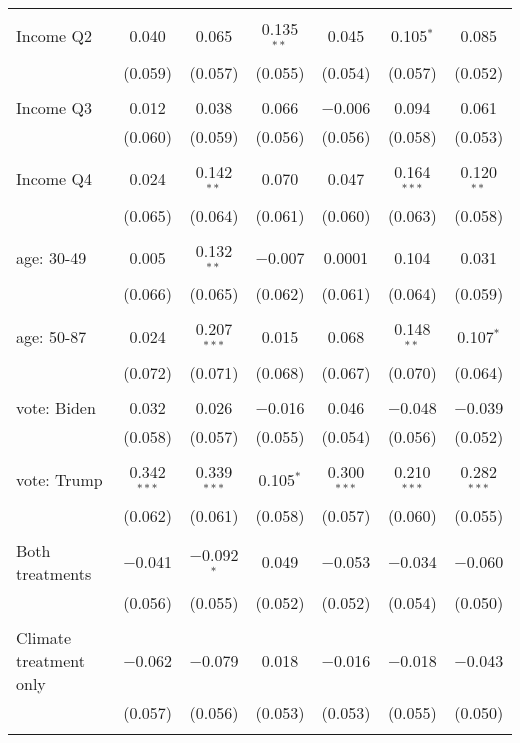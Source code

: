 \begin{tabular}{@{\extracolsep{5pt}}lcccccc}
  & & & & & & \\ 
 Income Q2 & 0.040 & 0.065 & 0.135$^{**}$ & 0.045 & 0.105$^{*}$ & 0.085 \\ 
  & (0.059) & (0.057) & (0.055) & (0.054) & (0.057) & (0.052) \\ 
  & & & & & & \\ 
 Income Q3 & 0.012 & 0.038 & 0.066 & $-$0.006 & 0.094 & 0.061 \\ 
  & (0.060) & (0.059) & (0.056) & (0.056) & (0.058) & (0.053) \\ 
  & & & & & & \\ 
 Income Q4 & 0.024 & 0.142$^{**}$ & 0.070 & 0.047 & 0.164$^{***}$ & 0.120$^{**}$ \\ 
  & (0.065) & (0.064) & (0.061) & (0.060) & (0.063) & (0.058) \\ 
  & & & & & & \\ 
 age: 30-49 & 0.005 & 0.132$^{**}$ & $-$0.007 & 0.0001 & 0.104 & 0.031 \\ 
  & (0.066) & (0.065) & (0.062) & (0.061) & (0.064) & (0.059) \\ 
  & & & & & & \\ 
 age: 50-87 & 0.024 & 0.207$^{***}$ & 0.015 & 0.068 & 0.148$^{**}$ & 0.107$^{*}$ \\ 
  & (0.072) & (0.071) & (0.068) & (0.067) & (0.070) & (0.064) \\ 
  & & & & & & \\ 
 vote: Biden & 0.032 & 0.026 & $-$0.016 & 0.046 & $-$0.048 & $-$0.039 \\ 
  & (0.058) & (0.057) & (0.055) & (0.054) & (0.056) & (0.052) \\ 
  & & & & & & \\ 
 vote: Trump & 0.342$^{***}$ & 0.339$^{***}$ & 0.105$^{*}$ & 0.300$^{***}$ & 0.210$^{***}$ & 0.282$^{***}$ \\ 
  & (0.062) & (0.061) & (0.058) & (0.057) & (0.060) & (0.055) \\ 
  & & & & & & \\ 
 Both treatments & $-$0.041 & $-$0.092$^{*}$ & 0.049 & $-$0.053 & $-$0.034 & $-$0.060 \\ 
  & (0.056) & (0.055) & (0.052) & (0.052) & (0.054) & (0.050) \\ 
  & & & & & & \\ 
 Climate treatment only & $-$0.062 & $-$0.079 & 0.018 & $-$0.016 & $-$0.018 & $-$0.043 \\ 
  & (0.057) & (0.056) & (0.053) & (0.053) & (0.055) & (0.050) \\ 
  & & & & & & \\ 

\end{tabular}
